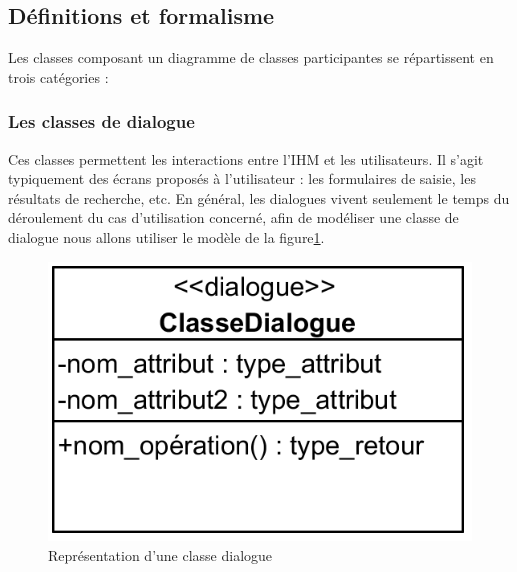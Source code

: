 \begin{itemize}
        \subsection{Définitions et formalisme}
        Les classes composant un diagramme de classes participantes se répartissent en trois catégories :\cite{6}
        
        \subsubsection{Les classes de dialogue}
        Ces classes permettent les interactions entre l’IHM et les utilisateurs. Il s’agit typiquement des écrans proposés à l’utilisateur : les formulaires de saisie, les résultats de recherche, etc. En général, les dialogues vivent seulement le temps du déroulement du cas d’utilisation concerné, afin de modéliser une classe de dialogue nous allons utiliser le modèle de la figure\ref{fig20}.
        
            \begin{figure}[h!]
                 \centering
                \includegraphics[scale=1.5]{images/dialogue.png}
                 \caption{Représentation d'une classe dialogue}
                 \label{fig20}
            \end{figure}
        

\end{itemize}
